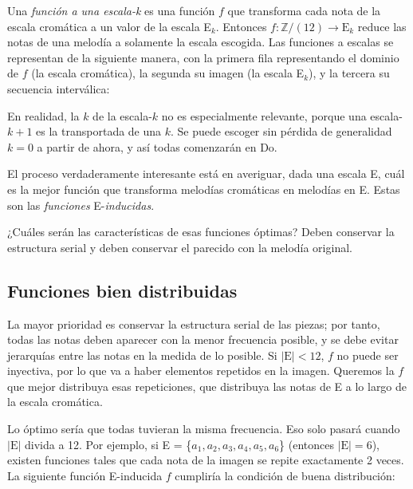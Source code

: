 		Una \textit{función a una escala-k} es una función $f$ que transforma cada nota de la escala cromática a un valor de la escala E$_k$. Entonces $f : \mathbb{Z}/(12) \rightarrow \text{E}_k$ reduce las notas de una melodía a solamente la escala escogida. Las funciones a escalas se representan de la siguiente manera, con la primera fila representando el dominio de $f$ (la escala cromática), la segunda su imagen (la escala E$_k$), y la tercera su secuencia interválica:
		
		
		En realidad, la $k$ de la escala-$k$ no es especialmente relevante, porque una escala-$k+1$ es la transportada de una $k$. Se puede escoger sin pérdida de generalidad $k=0$ a partir de ahora, y así todas comenzarán en Do.
		
		El proceso verdaderamente interesante está en averiguar, dada una escala E, cuál es la mejor función que transforma melodías cromáticas en melodías en E. Estas son las \textit{funciones} E-\textit{inducidas}.
		
		¿Cuáles serán las características de esas funciones óptimas? Deben conservar la estructura serial y deben conservar el parecido con la melodía original.
		
	\subsection{Funciones bien distribuidas}
		
		La mayor prioridad es conservar la estructura serial de las piezas; por tanto, todas las notas deben aparecer con la menor frecuencia posible, y se debe evitar jerarquías entre las notas en la medida de lo posible. Si $|\text{E}|<12$, $f$ no puede ser inyectiva, por lo que va a haber elementos repetidos en la imagen. Queremos la $f$ que mejor distribuya esas repeticiones, que distribuya las notas de E a lo largo de la escala cromática.
		
		Lo óptimo sería que todas tuvieran la misma frecuencia. Eso solo pasará cuando $|\text{E}|$ divida a 12. Por ejemplo, si E = \{$a_1,a_2,a_3,a_4,a_5,a_6$\} (entonces $|\text{E}|=6$), existen funciones tales que cada nota de la imagen se repite exactamente 2 veces. La siguiente función E-inducida $f$ cumpliría la condición de buena distribución:
				
